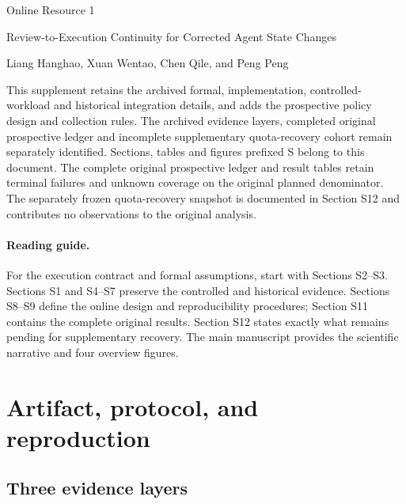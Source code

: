 \documentclass[11pt,a4paper]{article}
\begin{document}
\begin{center}
{\Large Online Resource 1}\par\medskip
{\large Review-to-Execution Continuity for Corrected Agent State Changes}\par\medskip
Liang Hanghao, Xuan Wentao, Chen Qile, and Peng Peng
\par{}
\end{center}

This supplement retains the archived formal, implementation, controlled-workload and historical integration details, and adds the prospective policy design and collection rules. The archived evidence layers, completed original prospective ledger and incomplete supplementary quota-recovery cohort remain separately identified. Sections, tables and figures prefixed S belong to this document. The complete original prospective ledger and result tables retain terminal failures and unknown coverage on the original planned denominator. The separately frozen quota-recovery snapshot is documented in Section S12 and contributes no observations to the original analysis.

\paragraph{Reading guide.} For the execution contract and formal assumptions, start with Sections S2--S3. Sections S1 and S4--S7 preserve the controlled and historical evidence. Sections S8--S9 define the online design and reproducibility procedures; Section S11 contains the complete original results. Section S12 states exactly what remains pending for supplementary recovery. The main manuscript provides the scientific narrative and four overview figures.

\section{Artifact, protocol, and reproduction}
\label{app:artifact}

\subsection{Three evidence layers}
\end{document}
